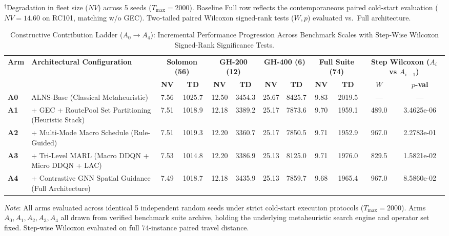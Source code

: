 \documentclass{ieeeaccess}
\begin{document}
\begin{table}[!t]
{\vspace{1mm}
$^\dagger$Degradation in fleet size ($NV$) across 5 seeds ($T_{\max}=2000$). Baseline Full row reflects the contemporaneous paired cold-start evaluation ($NV=14.60$ on RC101, matching w/o GEC). Two-tailed paired Wilcoxon signed-rank tests ($W, p$) evaluated vs.\ Full architecture.\par}
\end{table}

\begin{table}[!t]
\caption{Constructive Contribution Ladder ($A_0 \to A_4$): Incremental Performance Progression Across Benchmark Scales with Step-Wise Wilcoxon Signed-Rank Significance Tests.}
\label{tab:constructive_ladder}
\centering
\scriptsize
\setlength{\tabcolsep}{2.5pt}
\begin{tabular*}{\textwidth}{@{\extracolsep{\fill}} l l cc cc cc cc cc @{}}
\toprule
\multirow{2}{*}{\textbf{Arm}} & \multirow{2}{*}{\textbf{Architectural Configuration}} & \multicolumn{2}{c}{\textbf{Solomon (56)}} & \multicolumn{2}{c}{\textbf{GH-200 (12)}} & \multicolumn{2}{c}{\textbf{GH-400 (6)}} & \multicolumn{2}{c}{\textbf{Full Suite (74)}} & \multicolumn{2}{c}{\textbf{Step Wilcoxon ($A_i$ vs $A_{i-1}$)}} \\
\cmidrule(lr){3-4} \cmidrule(lr){5-6} \cmidrule(lr){7-8} \cmidrule(lr){9-10} \cmidrule(lr){11-12}
 & & \textbf{NV} & \textbf{TD} & \textbf{NV} & \textbf{TD} & \textbf{NV} & \textbf{TD} & \textbf{NV} & \textbf{TD} & $W$ & $p$\textbf{-val} \\
\midrule
\textbf{A0} & ALNS-Base (Classical Metaheuristic) & 7.56 & 1025.7 & 12.50 & 3454.3 & 25.67 & 8425.7 & 9.83 & 2019.5 & --- & --- \\
\textbf{A1} & + GEC + RoutePool Set Partitioning (Heuristic Stack) & 7.51 & 1018.9 & 12.18 & 3389.2 & 25.17 & 7873.6 & 9.70 & 1959.1 & 489.0 & 3.4625e-06 \\
\textbf{A2} & + Multi-Mode Macro Schedule (Rule-Guided) & 7.51 & 1019.3 & 12.20 & 3360.7 & 25.17 & 7850.5 & 9.71 & 1952.9 & 967.0 & 2.2783e-01 \\
\textbf{A3} & + Tri-Level MARL (Macro DDQN + Micro DDQN + LAC) & 7.53 & 1014.8 & 12.20 & 3386.9 & 25.13 & 8125.0 & 9.71 & 1976.0 & 829.5 & 1.5821e-02 \\
\textbf{A4} & + Contrastive GNN Spatial Guidance (Full Architecture) & 7.49 & 1018.7 & 12.18 & 3435.9 & 25.13 & 7859.7 & 9.68 & 1965.4 & 967.0 & 8.5860e-02 \\
\bottomrule
\end{tabular*}
{\raggedright 

\vspace{1mm}
\footnotesize \textit{Note}: All arms evaluated across identical 5 independent random seeds under strict cold-start execution protocols ($T_{\max}=2000$). Arms $A_0, A_1, A_2, A_3, A_4$ all drawn from verified benchmark suite archive, holding the underlying metaheuristic search engine and operator set fixed. Step-wise Wilcoxon evaluated on full 74-instance paired travel distance.\par}
\end{table}
\end{document}
